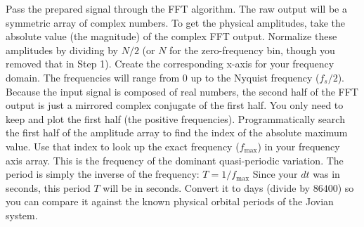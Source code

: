 {}
\markdownRendererSectionEnd \markdownRendererSectionBegin
{}\markdownRendererInterblockSeparator
{}Pass the prepared signal through the FFT algorithm. The raw output will be a symmetric array of complex numbers.\markdownRendererInterblockSeparator
{}\markdownRendererUlBegin
\markdownRendererUlItem To get the physical amplitudes, take the absolute value (the magnitude) of the complex FFT output.\markdownRendererUlItemEnd 
\markdownRendererUlItem Normalize these amplitudes by dividing by $N/2$ (or $N$ for the zero-frequency bin, though you removed that in Step 1).\markdownRendererUlItemEnd 
\markdownRendererUlEnd \markdownRendererInterblockSeparator
{}
\markdownRendererSectionEnd \markdownRendererSectionBegin
{}\markdownRendererInterblockSeparator
{}Create the corresponding x-axis for your frequency domain.\markdownRendererInterblockSeparator
{}\markdownRendererUlBegin
\markdownRendererUlItem The frequencies will range from $0$ up to the Nyquist frequency ($f_s / 2$).\markdownRendererUlItemEnd 
\markdownRendererUlItem Because the input signal is composed of real numbers, the second half of the FFT output is just a mirrored complex conjugate of the first half. You only need to keep and plot the first half (the positive frequencies).\markdownRendererUlItemEnd 
\markdownRendererUlEnd \markdownRendererInterblockSeparator
{}
\markdownRendererSectionEnd \markdownRendererSectionBegin
{}\markdownRendererInterblockSeparator
{}Programmatically search the first half of the amplitude array to find the index of the absolute maximum value. Use that index to look up the exact frequency ($f_{\text{max}}$) in your frequency axis array. This is the frequency of the dominant quasi-periodic variation.\markdownRendererInterblockSeparator
{}
\markdownRendererSectionEnd \markdownRendererSectionBegin
{}\markdownRendererInterblockSeparator
{}The period is simply the inverse of the frequency:\markdownRendererInterblockSeparator
{}\markdownRendererUlBegin
\markdownRendererUlItem $T = 1 / f_{\text{max}}$\markdownRendererUlItemEnd 
\markdownRendererUlItem Since your $dt$ was in seconds, this period $T$ will be in seconds. Convert it to days (divide by $86400$) so you can compare it against the known physical orbital periods of the Jovian system.\markdownRendererUlItemEnd 
\markdownRendererUlEnd \markdownRendererInterblockSeparator
